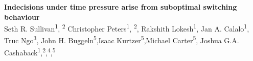 \documentclass[12pt,letterpaper]{article}
\begin{document}
\begin{center}

    \noindent\textbf{\Large\textcolor{mydarkblue}{Indecisions under time pressure arise from suboptimal switching behaviour
        }}
    \vspace{5mm}
    \\
    Seth R. Sullivan\textsuperscript{1}, \textsuperscript{2} Christopher Peters\textsuperscript{1}, \textsuperscript{2}, Rakshith Lokesh\textsuperscript{1}, Jan A. Calalo\textsuperscript{1},\\ Truc Ngo\textsuperscript{3}, John H. Buggeln\textsuperscript{5},Isaac Kurtzer\textsuperscript{5},Michael Carter\textsuperscript{5}, Joshua G.A. Cashaback\textsuperscript{1},\textsuperscript{2},\textsuperscript{4},\textsuperscript{5}
    \vspace{2mm}
    \\
\end{center}
\end{document}
